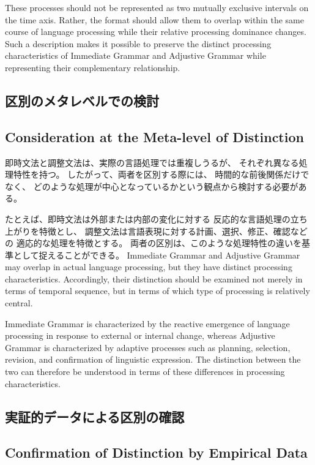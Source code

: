 \documentclass[a4paper]{article}
\begin{document}
These processes should not be represented as two mutually exclusive intervals
on the time axis.
Rather, the format should allow them to overlap within the same course of
language processing while their relative processing dominance changes.
Such a description makes it possible to preserve the distinct processing
characteristics of Immediate Grammar and Adjustive Grammar while representing
their complementary relationship.
\fi

\ifJPN
\subsection{区別のメタレベルでの検討}
\else
\subsection{Consideration at the Meta-level of Distinction}
\fi

\ifJPN
即時文法と調整文法は、実際の言語処理では重複しうるが、
それぞれ異なる処理特性を持つ。
したがって、両者を区別する際には、
時間的な前後関係だけでなく、
どのような処理が中心となっているかという観点から検討する必要がある。

たとえば、即時文法は外部または内部の変化に対する
反応的な言語処理の立ち上がりを特徴とし、
調整文法は言語表現に対する計画、選択、修正、確認などの
適応的な処理を特徴とする。
両者の区別は、このような処理特性の違いを基準として捉えることができる。
\else
Immediate Grammar and Adjustive Grammar may overlap in actual language processing,
but they have distinct processing characteristics.
Accordingly, their distinction should be examined not merely in terms of
temporal sequence, but in terms of which type of processing is relatively central.

Immediate Grammar is characterized by the reactive emergence of language processing
in response to external or internal change,
whereas Adjustive Grammar is characterized by adaptive processes such as
planning, selection, revision, and confirmation of linguistic expression.
The distinction between the two can therefore be understood in terms of
these differences in processing characteristics.
\fi

\ifJPN
\subsection{実証的データによる区別の確認}
\else
\subsection{Confirmation of Distinction by Empirical Data}
\fi
\end{document}
